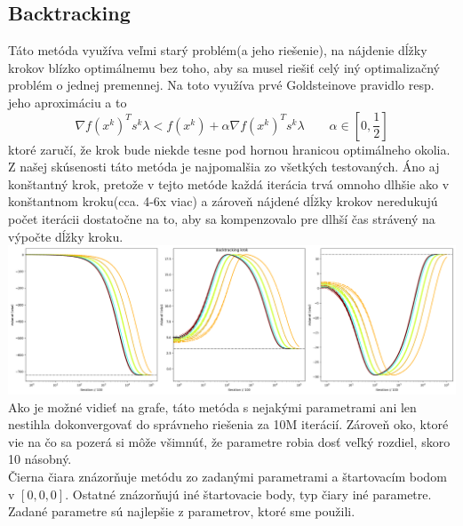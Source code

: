 \documentclass{article}
\begin{document}
\subsection{Backtracking}
Táto metóda využíva veľmi starý problém(a jeho riešenie), na nájdenie dĺžky krokov blízko optimálnemu bez toho, aby sa musel riešiť celý iný optimalizačný problém o jednej premennej. Na toto využíva prvé Goldsteinove pravidlo resp. jeho aproximáciu a to \[\nabla f(x^k)^T s^k \lambda < f(x^k) + \alpha \nabla f(x^k)^T s^k \lambda  \qquad \alpha \in \left[0,\frac{1}{2}\right]\] ktoré zaručí, že krok bude niekde tesne pod hornou hranicou optimálneho okolia.\\
Z našej skúsenosti táto metóda je najpomalšia zo všetkých testovaných. Áno aj konštantný krok, pretože v tejto metóde každá iterácia trvá omnoho dlhšie ako v konštantnom kroku(cca. 4-6x viac) a zároveň nájdené dĺžky krokov neredukujú počet iterácii dostatočne na to, aby sa kompenzovalo pre dlhší čas strávený na výpočte dĺžky kroku. \\ \includegraphics[width=\textwidth]{Backtracking.png}\\
Ako je možné vidieť na grafe, táto metóda s nejakými parametrami ani len nestihla dokonvergovať do správneho riešenia za 10M iterácií. Zároveň oko, ktoré vie na čo sa pozerá si môže všimnúť, že parametre robia dosť veľký rozdiel, skoro 10 násobný.\\
Čierna čiara znázorňuje metódu zo zadanými parametrami a štartovacím bodom v $\left [ 0,0,0\right ]$. Ostatné znázorňujú iné štartovacie body, typ čiary iné parametre. Zadané parametre sú najlepšie z parametrov, ktoré sme použili.
\end{document}

